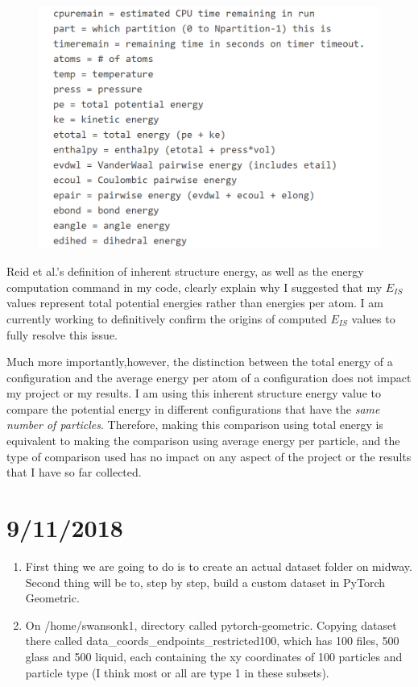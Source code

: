 \documentclass[12pt,reqno]{amsart}
\numberwithin{equation}{section}
\begin{document}
\begin{enumerate}
\begin{figure}[H]
\centering
\includegraphics[scale=0.7]{lammps_pe}
\end{figure}



   


Reid et al.'s definition of inherent structure energy, as well as the energy computation command in my code, clearly explain why I suggested that my $E_{IS}$ values represent total potential energies rather than energies per atom.  I am currently working to definitively confirm the origins of computed $E_{IS}$ values to fully resolve this issue.      

\par Much more importantly,however, the distinction between the total energy of a configuration and the average energy per atom of a configuration does not impact my project or my results.  I am using this inherent structure energy value to compare the potential energy in different configurations that have the \textit{same number of particles}.  Therefore, making this comparison using total energy is equivalent to making the comparison using average energy per particle, and the type of comparison used has no impact on any  aspect of the project or the results that I have so far collected.    


\end{enumerate}

\section{9/11/2018}
\begin{enumerate}
\item First thing we are going to do is to create an actual dataset folder on midway.  Second thing will be to, step by step, build a custom dataset in PyTorch Geometric.  
\item On /home/swansonk1, directory called pytorch-geometric.  Copying dataset there called data\_coords\_endpoints\_restricted100, which has 100 files, 500 glass and 500 liquid, each containing the xy coordinates of 100 particles and particle type (I think most or all are type 1 in these subsets).  
\end{enumerate}
\end{document}
